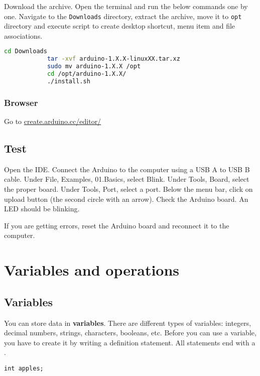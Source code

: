 \documentclass{article}
\begin{document}
			Download the  archive. Open the terminal and run the below commands one by one\@. Navigate to the \texttt{Downloads} directory, extract the archive, move it to \texttt{opt} directory and execute script to create desktop shortcut, menu item and file associations.

			\begin{lstlisting}[gobble=12, language=bash]
			cd Downloads
			tar -xvf arduino-1.X.X-linuxXX.tar.xz
			sudo mv arduino-1.X.X /opt
			cd /opt/arduino-1.X.X/
			./install.sh
			\end{lstlisting}

		\subsubsection{Browser}
			Go to \url{create.arduino.cc/editor/}

	\subsection{Test}

		Open the IDE\@. Connect the Arduino to the computer using a USB A to USB B cable. Under File, Examples, 01.Basics, select Blink. Under Tools, Board, select the proper board. Under Tools, Port, select a port. Below the menu bar, click on upload button (the second circle with an arrow). Check the Arduino board. An LED should be blinking.

		If you are getting errors, reset the Arduino board and reconnect it to the computer.

\section{Variables and operations}

	\subsection{Variables}

		You can store data in \textbf{variables}. There are different types of variables: integers, decimal numbers, strings, characters, booleans, etc. Before you can use a variable, you have to create it by writing a definition statement. All statements end with a \inlncd{;}.

		\begin{lstlisting}[gobble=8]
		int apples;
		\end{lstlisting}
\end{document}
